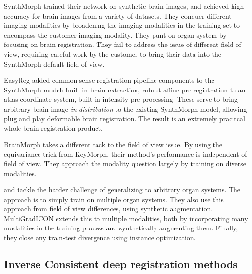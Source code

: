 \documentclass{article}
\begin{document}
SynthMorph\cite{SynthMorph} trained their network on synthetic brain images, and achieved high accuracy for brain images from a variety of datasets. They conquer different imaging modalities by broadening the imaging modalities in the training set to encompass the customer imaging modality. They punt on organ system by focusing on brain registration. They fail to address the issue of different field of view, requiring careful work by the customer to bring their data into the SynthMorph default field of view.

EasyReg\cite{EasyReg} added common sense registration pipeline components to the SynthMorph model: built in brain extraction, robust affine pre-registration to an atlas coordinate system, built in intensity pre-processing. These serve to bring arbitrary brain image \emph{in distribution} to the existing SynthMorph model, allowing plug and play deformable brain registration. The result is an extremely pracitcal whole brain registration product.

BrainMorph\cite{BrainMorph} takes a different tack to the field of view issue. By using the equivariance trick from KeyMorph\cite{KeyMorph}, their method's performance is independent of field of view. They approach the modality question largely by training on diverse modalities.

\cite{uniGradICON} and \cite{multiGradICON} tackle the harder challenge of generalizing to arbitrary organ systems. The approach is to simply train on multiple organ systems. They also use this approach from field of view differences, using synthetic augmentation. MultiGradICON extends this to multiple modalities, both by incorporating many modalities in the training process and synthetically augmenting them. Finally, they close any train-test divergence using instance optimization.

\subsection{Inverse Consistent deep registration methods}
\end{document}
